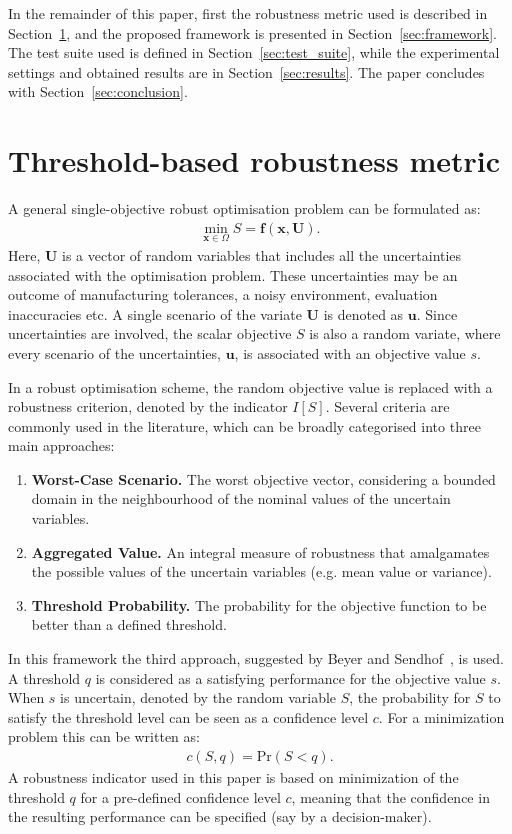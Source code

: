 \documentclass{llncs}
\newcommand{\brr}[1]{{\left({#1}\right)}} %
\newcommand{\I}[1]{I\!\left[{#1}\right]} %
\newcommand{\vx}{\mathbf{x}} %
\newcommand{\vf}{\mathbf{f}} %
\newcommand{\vu}{\mathbf{u}} %
\newcommand{\vU}{\mathbf{U}} %
\begin{document}
In the remainder of this paper, first the robustness metric used is described in Section~\ref{sec:robustness_metric}, and the proposed framework is presented in Section~\ref{sec:framework}. The test suite used is defined in Section~\ref{sec:test_suite}, while the experimental settings and obtained results are in Section~\ref{sec:results}. The paper concludes with Section~\ref{sec:conclusion}.

\section{Threshold-based robustness metric}\label{sec:robustness_metric}

A general single-objective robust optimisation problem can be formulated as:
\begin{align}
\min_{\vx\in\Omega} S=\vf\brr{\vx,\vU}.
\label{eq:rev:robust}
\end{align}
Here, $\vU$ is a vector of random variables that includes all the uncertainties associated with the optimisation problem. These uncertainties may be an outcome of manufacturing tolerances, a noisy environment, evaluation inaccuracies etc. A single scenario of the variate $\vU$ is denoted as $\vu$. Since uncertainties are involved, the scalar objective $S$ is also a random variate, where every scenario of the uncertainties, $\vu$, is associated with an objective value $s$.

In a robust optimisation scheme, the random objective value is replaced with a robustness criterion, denoted by the indicator $\I{S}$. Several criteria are commonly used in the literature, which can be broadly categorised into three main approaches:
\begin{enumerate}
\item \textbf{Worst-Case Scenario.} The worst objective vector, considering a bounded domain in the neighbourhood of the nominal values of the uncertain variables.
\item \textbf{Aggregated Value.} An integral measure of robustness that amalgamates the possible values of the uncertain variables (e.g. mean value or variance).
\item \textbf{Threshold Probability.} The probability for the objective function to be better than a defined threshold.
\end{enumerate}

In this framework the third approach, suggested by Beyer and Sendhof~\cite{Beyer2007}, is used. A threshold $q$ is considered as a satisfying performance for the objective value $s$. When $s$ is uncertain, denoted by the random variable $S$, the probability for $S$ to satisfy the threshold level can be seen as a confidence level $c$. For a minimization problem this can be written as:
\begin{align}
c\brr{S,q}=\text{Pr}\brr{S<q}.
\label{eq:confidence}
\end{align}
A robustness indicator used in this paper is based on minimization of the threshold $q$ for a pre-defined confidence level $c$, meaning that the confidence in the resulting performance can be specified (say by a decision-maker).
\end{document}
